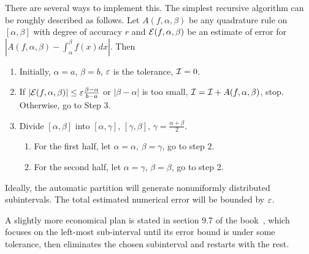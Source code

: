 There are several ways to implement this. The simplest recursive algorithm can be roughly described as follows. Let $A(f, \alpha, \beta)$ be any quadrature rule on $[\alpha, \beta]$ with degree of accuracy $r$ and $\mathcal E(f, \alpha, \beta)$ be an estimate of error for $|A(f, \alpha, \beta)-\int_{\alpha}^{\beta} f(x) dx|$. Then 
\begin{enumerate}
    \item Initially, $\alpha = a$, $\beta = b$, $\varepsilon$ is the tolerance, $\mathcal I = 0$.
    \item If $|\mathcal E(f, \alpha, \beta)| \le \varepsilon\frac{\beta - \alpha}{b - a}$ or $|\beta - \alpha|$ is too small, $\mathcal I =\mathcal I+A(f,\alpha, \beta)$, stop. Otherwise, go to Step 3.
    \item Divide $[\alpha, \beta]$ into $[\alpha, \gamma]$, $[\gamma, \beta]$, $\gamma = \frac{\alpha + \beta}{2}$. 
        \begin{enumerate}
            \item For the first half, let $\alpha = \alpha$, $\beta = \gamma$, go to step 2. 
            \item For the second half, let $\alpha = \gamma$, $\beta = \beta$, go to step 2. 
        \end{enumerate}
\end{enumerate}
Ideally, the automatic partition will generate nonuniformly distributed subintervals. The total estimated numerical error will be bounded by $\varepsilon$. 

A slightly more economical plan is stated in section 9.7 of the book~\cite{quarteroni2010numerical}, which focuses on the left-most sub-interval until its error bound is under some tolerance, then eliminates the chosen subinterval and restarts with the rest. 

